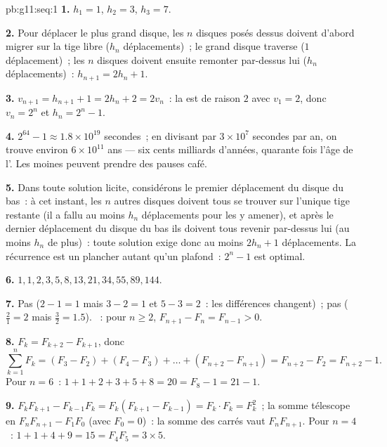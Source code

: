 \begin{solution}{pb:g11:seq:1}
\textbf{1.} $h_1 = 1$, $h_2 = 3$, $h_3 = 7$.

\textbf{2.} Pour déplacer le plus grand disque, les $n$ disques
posés dessus doivent d'abord migrer sur la tige libre ($h_n$
déplacements)~; le grand disque traverse ($1$ déplacement)~; les $n$
disques doivent ensuite remonter par-dessus lui ($h_n$
déplacements)~: $h_{n+1} = 2h_n + 1$.

\textbf{3.} $v_{n+1} = h_{n+1} + 1 = 2h_n + 2 = 2v_n$~: la  est
 de raison $2$ avec $v_1 = 2$, donc $v_n = 2^n$ et
$h_n = 2^n - 1$.

\textbf{4.} $2^{64} - 1 \approx 1.8 \times 10^{19}$ secondes~; en
divisant par $3 \times 10^7$ secondes par an, on trouve environ
$6 \times 10^{11}$ ans --- six cents milliards d'années, quarante
fois l'âge de l'. Les moines peuvent prendre des pauses
café.

\textbf{5.} Dans toute solution licite, considérons le premier
déplacement du disque du bas~: à cet instant, les $n$ autres disques
doivent tous se trouver sur l'unique tige restante (il a fallu au
moins $h_n$ déplacements pour les y amener), et après le dernier
déplacement du disque du bas ils doivent tous revenir par-dessus lui
(au moins $h_n$ de plus)~: toute solution exige donc au moins
$2h_n + 1$ déplacements. La récurrence est un plancher autant qu'un
plafond~: $2^n - 1$ est optimal.

\textbf{6.} $1, 1, 2, 3, 5, 8, 13, 21, 34, 55, 89, 144$.

\textbf{7.} Pas  ($2 - 1 = 1$ mais $3 - 2 = 1$ et
$5 - 3 = 2$~: les différences changent)~; pas 
($\frac21 = 2$ mais $\frac32 = 1.5$). ~: pour
$n \geq 2$, $F_{n+1} - F_n = F_{n-1} > 0$.

\textbf{8.} $F_k = F_{k+2} - F_{k+1}$, donc
\[
\sum_{k=1}^{n} F_k = (F_3 - F_2) + (F_4 - F_3) + \dots +
(F_{n+2} - F_{n+1}) = F_{n+2} - F_2 = F_{n+2} - 1 .
\]
Pour $n = 6$~: $1 + 1 + 2 + 3 + 5 + 8 = 20 = F_8 - 1 = 21 - 1$.

\textbf{9.} $F_k F_{k+1} - F_{k-1} F_k = F_k (F_{k+1} -
F_{k-1}) = F_k \cdot F_k = F_k^2$~; la somme télescope en
$F_n F_{n+1} - F_1 F_0$ (avec $F_0 = 0$)~: la somme des carrés vaut
$F_n F_{n+1}$. Pour $n = 4$~: $1 + 1 + 4 + 9 = 15 = F_4 F_5 =
3 \times 5$.


\end{solution}
